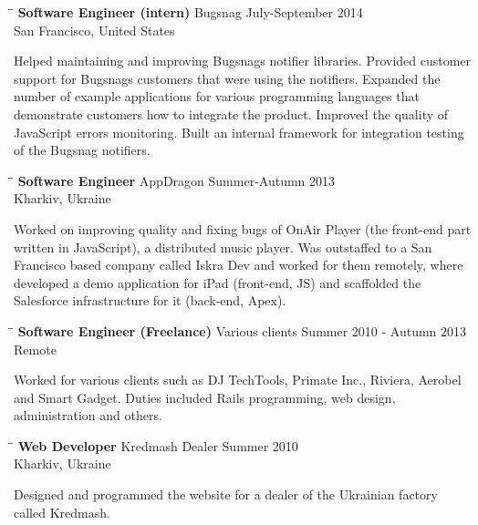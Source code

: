 \documentclass{res}
\begin{document}
\begin{resume}
 \begin{tabbing}%
    \hspace{2.3in}\= \hspace{2.6in}\= \kill %
    {\bf Software Engineer (intern)}  \>Bugsnag \> July-September  2014\\
    \>San Francisco, United States
  \end{tabbing}\vspace{-20pt}
  Helped maintaining and improving Bugsnag\textquotesingle s notifier
  libraries. Provided customer support for Bugsnag\textquotesingle s customers
  that were using the notifiers. Expanded the number of example applications for
  various programming languages that demonstrate customers how to integrate the
  product. Improved the quality of JavaScript errors monitoring. Built an
  internal framework for integration testing of the Bugsnag notifiers.

  \begin{tabbing}%
    \hspace{2.3in}\= \hspace{2.6in}\= \kill %
    {\bf Software Engineer}  \>AppDragon \> Summer-Autumn  2013\\
    \>Kharkiv, Ukraine
  \end{tabbing}\vspace{-20pt}
  Worked on improving quality and fixing bugs of OnAir Player (the front-end
  part written in JavaScript), a distributed music player. Was outstaffed to a
  San Francisco based company called Iskra Dev and worked for them remotely,
  where developed a demo application for iPad (front-end, JS) and scaffolded the
  Salesforce infrastructure for it (back-end, Apex).

  \begin{tabbing}%
    \hspace{2.3in}\= \hspace{2.6in}\= \kill %
    {\bf Software Engineer (Freelance)}  \>Various clients \> Summer 2010 - Autumn 2013\\
    \>Remote
  \end{tabbing}\vspace{-20pt}
  Worked for various clients such as DJ TechTools, Primate Inc., Riviera,
  Aerobel and Smart Gadget. Duties included Rails programming, web design,
  administration and others.

  \begin{tabbing}
    \hspace{2.3in}\= \hspace{2.6in}\= \kill %
    {\bf Web Developer} \>Kredmash Dealer \> Summer 2010\\
    \>Kharkiv, Ukraine
  \end{tabbing}\vspace{-20pt}
  Designed and programmed the website for a dealer of the Ukrainian factory
  called Kredmash.


\end{resume}
\end{document}

